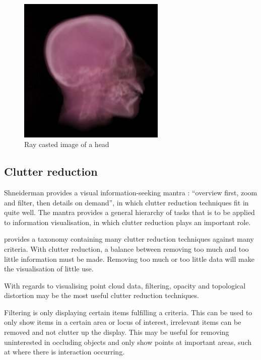\begin{figure}[h!]
  \begin{center}
    \includegraphics[width=70mm]{head_volume}
  \end{center}
  \caption{Ray casted image of a head}
  \label{fig:background_head}
\end{figure}


\subsection{Clutter reduction}
\label{sub:background_clutter}

Shneiderman provides a visual information-seeking mantra \citep{shneiderman96}:
``overview first, zoom and filter, then details on demand'', in which clutter
reduction techniques fit in quite well. The mantra provides a general hierarchy
of tasks that is to be applied to information visualisation, in which clutter
reduction plays an important role.

\citet{ellis07} provides a taxonomy containing many clutter reduction techniques
against many criteria. With clutter reduction, a balance between removing too
much and too little information must be made. Removing too much or too little
data will make the visualisation of little use.

With regards to visualising point cloud data, filtering, opacity and topological
distortion may be the most useful clutter reduction techniques.

Filtering is only displaying certain items fulfilling a criteria. This can be
used to only show items in a certain area or locus of interest, irrelevant items
can be removed and not clutter up the display. This may be useful for removing
uninterested in occluding objects and only show points at important areas, such
at where there is interaction occurring.

